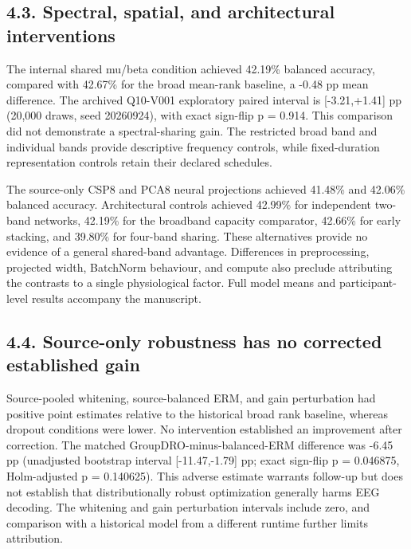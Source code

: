\documentclass[11pt]{article}
\begin{document}
\subsection*{4.3. Spectral, spatial, and architectural interventions}
The internal shared mu/beta condition achieved 42.19\% balanced accuracy, compared with 42.67\% for the broad mean-rank baseline, a -0.48 pp mean difference. The archived Q10-V001 exploratory paired interval is [-3.21,+1.41] pp (20,000 draws, seed 20260924), with exact sign-flip p = 0.914. This comparison did not demonstrate a spectral-sharing gain. The restricted broad band and individual bands provide descriptive frequency controls, while fixed-duration representation controls retain their declared schedules.

The source-only CSP8 and PCA8 neural projections achieved 41.48\% and 42.06\% balanced accuracy. Architectural controls achieved 42.99\% for independent two-band networks, 42.19\% for the broadband capacity comparator, 42.66\% for early stacking, and 39.80\% for four-band sharing. These alternatives provide no evidence of a general shared-band advantage. Differences in preprocessing, projected width, BatchNorm behaviour, and compute also preclude attributing the contrasts to a single physiological factor. Full model means and participant-level results accompany the manuscript.

\subsection*{4.4. Source-only robustness has no corrected established gain}
Source-pooled whitening, source-balanced ERM, and gain perturbation had positive point estimates relative to the historical broad rank baseline, whereas dropout conditions were lower. No intervention established an improvement after correction. The matched GroupDRO-minus-balanced-ERM difference was -6.45 pp (unadjusted bootstrap interval [-11.47,-1.79] pp; exact sign-flip p = 0.046875, Holm-adjusted p = 0.140625). This adverse estimate warrants follow-up but does not establish that distributionally robust optimization generally harms EEG decoding. The whitening and gain perturbation intervals include zero, and comparison with a historical model from a different runtime further limits attribution.
\end{document}
